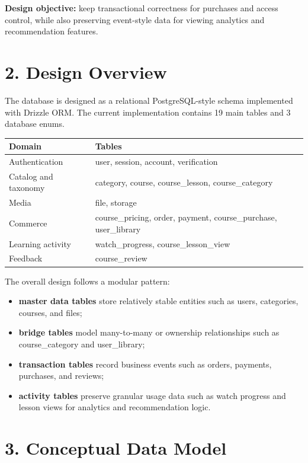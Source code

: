 \documentclass[11pt,a4paper]{article}
\begin{document}
\begin{summarybox}
\textbf{Design objective:} keep transactional correctness for purchases and access control, while also preserving event-style data for viewing analytics and recommendation features.
\end{summarybox}

\section*{2. Design Overview}
The database is designed as a relational PostgreSQL-style schema implemented with Drizzle ORM. The current implementation contains 19 main tables and 3 database enums.

\begin{tabularx}{\textwidth}{L{3.1cm}Y}
\toprule
\textbf{Domain} & \textbf{Tables} \\
\midrule
Authentication & user, session, account, verification \\
Catalog and taxonomy & category, course, course\_lesson, course\_category \\
Media & file, storage \\
Commerce & course\_pricing, order, payment, course\_purchase, user\_library \\
Learning activity & watch\_progress, course\_lesson\_view \\
Feedback & course\_review \\
\bottomrule
\end{tabularx}

The overall design follows a modular pattern:

\begin{itemize}[leftmargin=1.5em]
	\item \textbf{master data tables} store relatively stable entities such as users, categories, courses, and files;
	\item \textbf{bridge tables} model many-to-many or ownership relationships such as course\_category and user\_library;
	\item \textbf{transaction tables} record business events such as orders, payments, purchases, and reviews;
	\item \textbf{activity tables} preserve granular usage data such as watch progress and lesson views for analytics and recommendation logic.
\end{itemize}

\section*{3. Conceptual Data Model}
\end{document}
